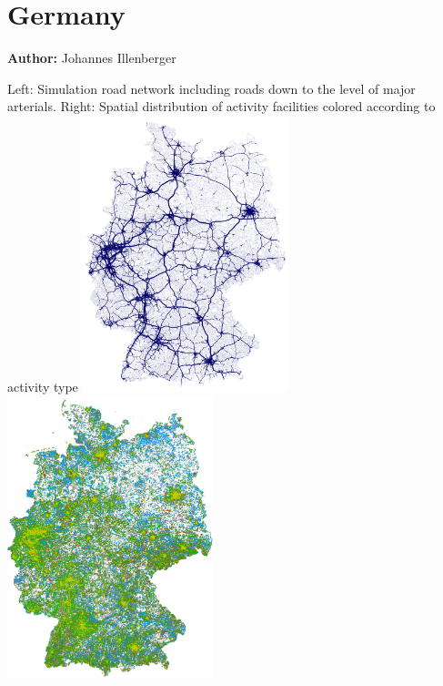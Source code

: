 \chapter{Germany}
\label{ch:germany}
\hfill \textbf{Author:} Johannes Illenberger


\createfigure%
{}%
{Left: Simulation road network including roads down to the level of major arterials. Right: Spatial distribution of activity facilities colored according to activity type}%
{\label{fig:germany:network}}%
{\includegraphics[width=0.45\textwidth, angle=0]{./scenarios/figures/germany-network}\hspace{5mm}\includegraphics[width=0.45\textwidth, angle=0]{./scenarios/figures/germany-facilities}}%
{}

